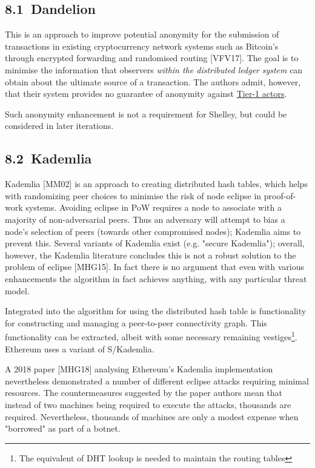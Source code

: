 \documentclass[11pt,a4paper]{article}
\begin{document}
\hypertarget{dandelion}{%
\subsection{​8.1​~Dandelion}\label{dandelion}}

This is an approach to improve potential anonymity for the submission of
transactions in existing cryptocurrency network systems such as
Bitcoin's through encrypted forwarding and randomised routing
{[}VFV17{]}. The goal is to minimise the information that observers
\emph{within the distributed ledger} \emph{system} can obtain about the
ultimate source of a transaction. The authors admit, however, that their
system provides no guarantee of anonymity against
\protect\hyperlink{tier-1-actors}{{Tier-1 actors}}.

Such anonymity enhancement is not a requirement for Shelley, but could
be considered in later iterations.

\hypertarget{kademlia}{%
\subsection{​8.2​~Kademlia}\label{kademlia}}

Kademlia {[}MM02{]} is an approach to creating distributed hash tables,
which helps with randomizing peer choices to minimise the risk of node
eclipse in proof-of-work systems. Avoiding eclipse in PoW requires a
node to associate with a majority of non-adversarial peers. Thus an
adversary will attempt to bias a node's selection of peers (towards
other compromised nodes); Kademlia aims to prevent this. Several
variants of Kademlia exist (e.g. "secure Kademlia"); overall, however,
the Kademlia literature concludes this is not a robust solution to the
problem of eclipse {[}MHG15{]}. In fact there is no argument that even
with various enhancements the algorithm in fact achieves anything, with
any particular threat model.

Integrated into the algorithm for using the distributed hash table is
functionality for constructing and managing a peer-to-peer connectivity
graph. This functionality can be extracted, albeit with some necessary
remaining vestiges\footnote{The equivalent of DHT lookup is needed to
  maintain the routing tables}. Ethereum uses a variant of S/Kademlia.

A 2018 paper {[}MHG18{]} analysing Ethereum's Kademlia implementation
nevertheless demonstrated a number of different eclipse attacks
requiring minimal resources. The countermeasures suggested by the paper
authors mean that instead of two machines being required to execute the
attacks, thousands are required. Nevertheless, thousands of machines are
only a modest expense when "borrowed" as part of a botnet.
\end{document}
